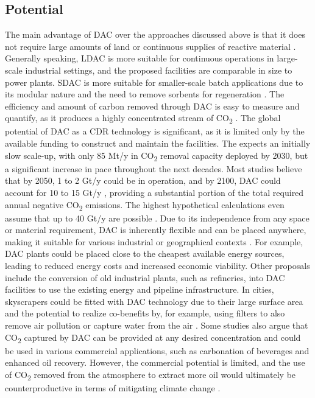 \subsection*{Potential}
The main advantage of DAC over the approaches discussed above is that it does not require large amounts of land or continuous supplies of reactive material \parencite{Mulligan2020CarbonShot:States, IEA2022DirectZero}.
Generally speaking, LDAC is more suitable for continuous operations in large-scale industrial settings, and the proposed facilities are comparable in size to power plants. SDAC is more suitable for smaller-scale batch applications due to its modular nature and the need to remove sorbents for regeneration \parencite[22-23]{IEA2022DirectZero}. The efficiency and amount of carbon removed through DAC is easy to measure and quantify, as it produces a highly concentrated stream of CO\textsubscript{2} \parencite{Lawler2022WhatTechnology}.
The global potential of DAC as a CDR technology is significant, as it is limited only by the available funding to construct and maintain the facilities. The \textcite{IEA2022DirectZero} expects an initially slow scale-up, with only 85 Mt/y in CO\textsubscript{2} removal capacity deployed by 2030, but a significant increase in pace throughout the next decades. Most studies believe that by 2050, 1 to 2 Gt/y could be in operation, and by 2100, DAC could account for 10 to 15 Gt/y \parencite{Mulligan2020CarbonShot:States, IEA2022DirectZero}, providing a substantial portion of the total required annual negative CO\textsubscript{2} emissions. The highest hypothetical calculations even assume that up to 40 Gt/y are possible \parencite{Fuss2018NegativeEffects}.
Due to its independence from any space or material requirement, DAC is inherently flexible and can be placed anywhere, making it suitable for various industrial or geographical contexts \parencite[189]{NAS2018NegativeAgenda}. For example, DAC plants could be placed close to the cheapest available energy sources, leading to reduced energy costs and increased economic viability. Other proposals include the conversion of old industrial plants, such as refineries, into DAC facilities to use the existing energy and pipeline infrastructure. In cities, skyscrapers could be fitted with DAC technology due to their large surface area and the potential to realize co-benefits by, for example, using filters to also remove air pollution or capture water from the air \parencite{Lawler2022WhatTechnology}. Some studies also argue that CO\textsubscript{2} captured by DAC can be provided at any desired concentration and could be used in various commercial applications, such as carbonation of beverages and enhanced oil recovery. However, the commercial potential is limited, and the use of CO\textsubscript{2} removed from the atmosphere to extract more oil would ultimately be counterproductive in terms of mitigating climate change \parencite{Erans2022DirectChallenges}.

